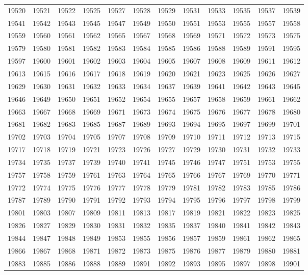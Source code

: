 \begin{center}
\begin{longtable}{llllllllllll}
19520 &19521 &19522 &19525 &19527 &19528 &19529 &19531 &19533 &19535 &19537 &19539 \\
19541 &19542 &19543 &19545 &19547 &19549 &19550 &19551 &19553 &19555 &19557 &19558 \\
19559 &19560 &19561 &19562 &19565 &19567 &19568 &19569 &19571 &19572 &19573 &19575 \\
19579 &19580 &19581 &19582 &19583 &19584 &19585 &19586 &19588 &19589 &19591 &19595 \\
19597 &19600 &19601 &19602 &19603 &19604 &19605 &19607 &19608 &19609 &19611 &19612 \\
19613 &19615 &19616 &19617 &19618 &19619 &19620 &19621 &19623 &19625 &19626 &19627 \\
19629 &19630 &19631 &19632 &19633 &19634 &19637 &19639 &19641 &19642 &19643 &19645 \\
19646 &19649 &19650 &19651 &19652 &19654 &19655 &19657 &19658 &19659 &19661 &19662 \\
19663 &19667 &19668 &19669 &19671 &19673 &19674 &19675 &19676 &19677 &19678 &19680 \\
19681 &19682 &19683 &19685 &19687 &19689 &19693 &19694 &19695 &19697 &19699 &19701 \\
19702 &19703 &19704 &19705 &19707 &19708 &19709 &19710 &19711 &19712 &19713 &19715 \\
19717 &19718 &19719 &19721 &19723 &19726 &19727 &19729 &19730 &19731 &19732 &19733 \\
19734 &19735 &19737 &19739 &19740 &19741 &19745 &19746 &19747 &19751 &19753 &19755 \\
19757 &19758 &19759 &19761 &19763 &19764 &19765 &19766 &19767 &19769 &19770 &19771 \\
19772 &19774 &19775 &19776 &19777 &19778 &19779 &19781 &19782 &19783 &19785 &19786 \\
19787 &19789 &19790 &19791 &19792 &19793 &19794 &19795 &19796 &19797 &19798 &19799 \\
19801 &19803 &19807 &19809 &19811 &19813 &19817 &19819 &19821 &19822 &19823 &19825 \\
19826 &19827 &19829 &19830 &19831 &19832 &19835 &19837 &19840 &19841 &19842 &19843 \\
19844 &19847 &19848 &19849 &19853 &19855 &19856 &19857 &19859 &19861 &19862 &19865 \\
19866 &19867 &19868 &19871 &19872 &19873 &19875 &19876 &19877 &19879 &19880 &19881 \\
19883 &19885 &19886 &19888 &19889 &19891 &19892 &19893 &19895 &19897 &19898 &19901 \\

\end{longtable}
\end{center}
